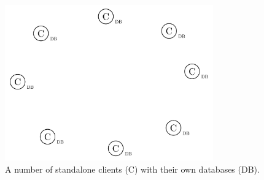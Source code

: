 \begin{figure}
  \centering
  \includegraphics[width=0.8\textwidth]{include/assets/standalone-agents.pdf}
  \caption{A number of standalone clients (C) with their own databases (DB).}
\end{figure}
